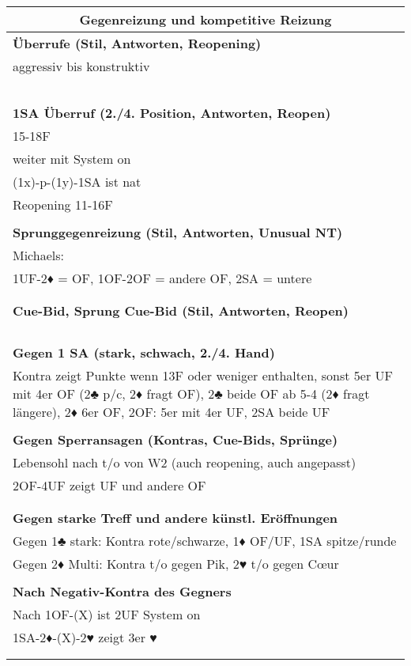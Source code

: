 \documentclass{article}
\begin{document}
\begin{multicols}{3}
\raggedcolumns

\begin{tabularx}{\columnwidth}{|X|}
\hline \multicolumn{1}{|c|}{\bf \large Gegenreizung und kompetitive Reizung} \\
\hline \bf Überrufe (Stil, Antworten, Reopening) \\
 aggressiv bis konstruktiv \\
\\
\\
\\
\\
\\
\hline \bf 1SA Überruf (2./4. Position, Antworten, Reopen) \\
 15-18F \\
 weiter mit System on \\
 (1x)-p-(1y)-1SA ist nat \\
 Reopening 11-16F\\
\\
\hline \bf Sprunggegenreizung (Stil, Antworten, Unusual NT) \\
 Michaels: \\
 1UF-2♦ = OF, 1OF-2OF = andere OF, 2SA = untere \\
\\
\\
\hline \bf Cue-Bid, Sprung Cue-Bid (Stil, Antworten, Reopen) \\
\\
\\
\\
\\
\hline \bf Gegen 1 SA (stark, schwach, 2./4. Hand) \\
\hline Kontra zeigt Punkte wenn 13F oder weniger enthalten, sonst 5er UF mit 4er OF (2♣ p/c, 2♦ fragt OF), 2♣ beide OF ab 5-4 (2♦ fragt längere), 2♦ 6er OF, 2OF: 5er mit 4er UF, 2SA beide UF \\
\\
\hline \bf Gegen Sperransagen (Kontras, Cue-Bids, Sprünge) \\
\hline Lebensohl nach t/o von W2 (auch reopening, auch angepasst)\\
2OF-4UF zeigt UF und andere OF\\
\\
\\
\hline \bf Gegen starke Treff und andere künstl. Eröffnungen \\
\hline Gegen 1♣ stark: Kontra rote/schwarze, 1♦ OF/UF, 1SA spitze/runde\\
Gegen 2♦ Multi: Kontra t/o gegen Pik, 2♥ t/o gegen C\oe{}ur\\
\\
\hline \bf Nach Negativ-Kontra des Gegners \\
 Nach 1OF-(X) ist 2UF System on \\
 1SA-2♦-(X)-2♥ zeigt 3er ♥ \\
\\
\\
\hline \end{tabularx}


\end{multicols}
\end{document}

